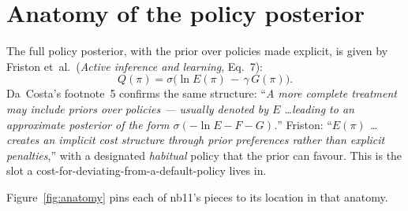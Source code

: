 \documentclass[11pt,a4paper]{article}
\theoremstyle{plain}
\begin{document}
\section{Anatomy of the policy posterior}

The full policy posterior, with the prior over policies made explicit,
is given by Friston et~al.\ (\emph{Active inference and learning},
Eq.~7):
\begin{equation}
Q(\pi) = \sigma\big(\ln E(\pi) \,-\, \gamma\, G(\pi)\big).
\label{eq:Qpi-full}
\end{equation}
Da~Costa's footnote~5 confirms the same structure: ``\emph{A more
complete treatment may include priors over policies --- usually denoted
by $E$ \dots leading to an approximate posterior of the form
$\sigma(-\ln E - F - G)$.}'' Friston: ``\emph{$E(\pi)$ \dots creates an
implicit cost structure through prior preferences rather than explicit
penalties},'' with a designated \emph{habitual} policy that the prior
can favour. This is the slot a cost-for-deviating-from-a-default-policy
lives in.

Figure~\ref{fig:anatomy} pins each of nb11's pieces to its location in
that anatomy.
\end{document}

